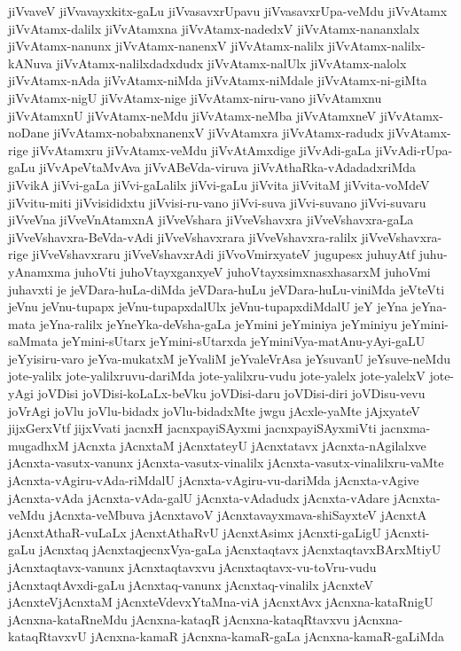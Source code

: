 {jiVvaveV
jiVvavayxkitx-gaLu
jiVvasavxrUpavu
jiVvasavxrUpa-veMdu
jiVvAtamx
jiVvAtamx-dalilx
jiVvAtamxna
jiVvAtamx-nadedxV
jiVvAtamx-nananxlalx
jiVvAtamx-nanunx
jiVvAtamx-nanenxV
jiVvAtamx-nalilx
jiVvAtamx-nalilx-kANuva
jiVvAtamx-nalilxdadxdudx
jiVvAtamx-nalUlx
jiVvAtamx-nalolx
jiVvAtamx-nAda
jiVvAtamx-niMda
jiVvAtamx-niMdale
jiVvAtamx-ni-giMta
jiVvAtamx-nigU
jiVvAtamx-nige
jiVvAtamx-niru-vano
jiVvAtamxnu
jiVvAtamxnU
jiVvAtamx-neMdu
jiVvAtamx-neMba
jiVvAtamxneV
jiVvAtamx-noDane
jiVvAtamx-nobabxnanenxV
jiVvAtamxra
jiVvAtamx-radudx
jiVvAtamx-rige
jiVvAtamxru
jiVvAtamx-veMdu
jiVvAtAmxdige
jiVvAdi-gaLa
jiVvAdi-rUpa-gaLu
jiVvApeVtaMvAva
jiVvABeVda-viruva
jiVvAthaRka-vAdadadxriMda
jiVvikA
jiVvi-gaLa
jiVvi-gaLalilx
jiVvi-gaLu
jiVvita
jiVvitaM
jiVvita-voMdeV
jiVvitu-miti
jiVvisididxtu
jiVvisi-ru-vano
jiVvi-suva
jiVvi-suvano
jiVvi-suvaru
jiVveVna
jiVveVnAtamxnA
jiVveVshara
jiVveVshavxra
jiVveVshavxra-gaLa
jiVveVshavxra-BeVda-vAdi
jiVveVshavxrara
jiVveVshavxra-ralilx
jiVveVshavxra-rige
jiVveVshavxraru
jiVveVshavxrAdi
jiVvoVmirxyateV
jugupesx
juhuyAtf
juhu-yAnamxma
juhoVti
juhoVtayxganxyeV
juhoVtayxsimxnasxhasarxM
juhoVmi
juhavxti
je
jeVDara-huLa-diMda
jeVDara-huLu
jeVDara-huLu-viniMda
jeVteVti
jeVnu
jeVnu-tupapx
jeVnu-tupapxdalUlx
jeVnu-tupapxdiMdalU
jeY
jeYna
jeYna-mata
jeYna-ralilx
jeYneYka-deVsha-gaLa
jeYmini
jeYminiya
jeYminiyu
jeYmini-saMmata
jeYmini-sUtarx
jeYmini-sUtarxda
jeYminiVya-matAnu-yAyi-gaLU
jeYyisiru-varo
jeYva-mukatxM
jeYvaliM
jeYvaleVrAsa
jeYsuvanU
jeYsuve-neMdu
jote-yalilx
jote-yalilxruvu-dariMda
jote-yalilxru-vudu
jote-yalelx
jote-yalelxV
jote-yAgi
joVDisi
joVDisi-koLaLx-beVku
joVDisi-daru
joVDisi-diri
joVDisu-vevu
joVrAgi
joVlu
joVlu-bidadx
joVlu-bidadxMte
jwgu
jAcxle-yaMte
jAjxyateV
jijxGerxVtf
jijxVvati
jacnxH
jacnxpayiSAyxmi
jacnxpayiSAyxmiVti
jacnxma-mugadhxM
jAcnxta
jAcnxtaM
jAcnxtateyU
jAcnxtatavx
jAcnxta-nAgilalxve
jAcnxta-vasutx-vanunx
jAcnxta-vasutx-vinalilx
jAcnxta-vasutx-vinalilxru-vaMte
jAcnxta-vAgiru-vAda-riMdalU
jAcnxta-vAgiru-vu-dariMda
jAcnxta-vAgive
jAcnxta-vAda
jAcnxta-vAda-galU
jAcnxta-vAdadudx
jAcnxta-vAdare
jAcnxta-veMdu
jAcnxta-veMbuva
jAcnxtavoV
jAcnxtavayxmava-shiSayxteV
jAcnxtA
jAcnxtAthaR-vuLaLx
jAcnxtAthaRvU
jAcnxtAsimx
jAcnxti-gaLigU
jAcnxti-gaLu
jAcnxtaq
jAcnxtaqjecnxVya-gaLa
jAcnxtaqtavx
jAcnxtaqtavxBArxMtiyU
jAcnxtaqtavx-vanunx
jAcnxtaqtavxvu
jAcnxtaqtavx-vu-toVru-vudu
jAcnxtaqtAvxdi-gaLu
jAcnxtaq-vanunx
jAcnxtaq-vinalilx
jAcnxteV
jAcnxteVjAcnxtaM
jAcnxteVdevxYtaMna-viA
jAcnxtAvx
jAcnxna-kataRnigU
jAcnxna-kataRneMdu
jAcnxna-kataqR
jAcnxna-kataqRtavxvu
jAcnxna-kataqRtavxvU
jAcnxna-kamaR
jAcnxna-kamaR-gaLa
jAcnxna-kamaR-gaLiMda
}

